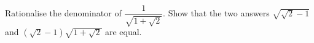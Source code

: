 Rationalise the denominator of $\dfrac{1}{\sqrt{1+\sqrt2}}$. Show that the two answers $\sqrt{\sqrt2-1}$ and $\left(\sqrt2-1\right)\sqrt{1+\sqrt2}$ are equal.
